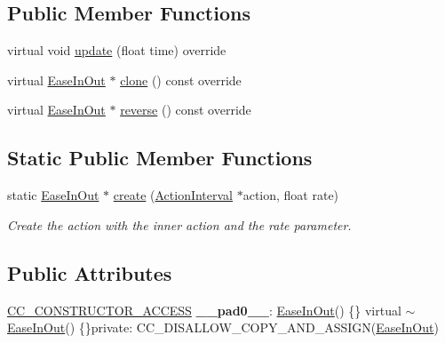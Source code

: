 \subsection*{Public Member Functions}
\begin{DoxyCompactItemize}
\item 
virtual void \hyperlink{classEaseInOut_ac0e5f3d973cdc7b7d83cc73774ae0321}{update} (float time) override
\item 
virtual \hyperlink{classEaseInOut}{Ease\+In\+Out} $\ast$ \hyperlink{classEaseInOut_a5bee2d31db0c1fefd2656c8eedd5831e}{clone} () const override
\item 
virtual \hyperlink{classEaseInOut}{Ease\+In\+Out} $\ast$ \hyperlink{classEaseInOut_ab11193be98284ab001e120888b92803f}{reverse} () const override
\end{DoxyCompactItemize}
\subsection*{Static Public Member Functions}
\begin{DoxyCompactItemize}
\item 
static \hyperlink{classEaseInOut}{Ease\+In\+Out} $\ast$ \hyperlink{classEaseInOut_a958386e97d4c1988444cc4f4acf33102}{create} (\hyperlink{classActionInterval}{Action\+Interval} $\ast$action, float rate)
\begin{DoxyCompactList}\small\item\em Create the action with the inner action and the rate parameter. \end{DoxyCompactList}\end{DoxyCompactItemize}
\subsection*{Public Attributes}
\begin{DoxyCompactItemize}
\item 
\mbox{\label{classEaseInOut_aba785701c6ce41a5658a2f4a6b69f8d2}} 
\hyperlink{_2cocos2d_2cocos_2base_2ccConfig_8h_a25ef1314f97c35a2ed3d029b0ead6da0}{C\+C\+\_\+\+C\+O\+N\+S\+T\+R\+U\+C\+T\+O\+R\+\_\+\+A\+C\+C\+E\+SS} {\bfseries \+\_\+\+\_\+pad0\+\_\+\+\_\+}\+: \hyperlink{classEaseInOut}{Ease\+In\+Out}() \{\} virtual $\sim$\hyperlink{classEaseInOut}{Ease\+In\+Out}() \{\}private\+: C\+C\+\_\+\+D\+I\+S\+A\+L\+L\+O\+W\+\_\+\+C\+O\+P\+Y\+\_\+\+A\+N\+D\+\_\+\+A\+S\+S\+I\+GN(\hyperlink{classEaseInOut}{Ease\+In\+Out})
\end{DoxyCompactItemize}
